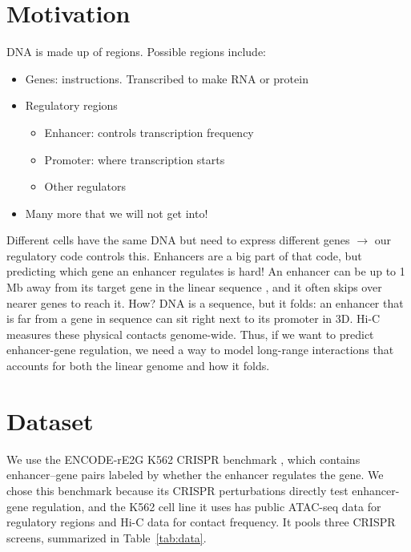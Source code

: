 \section{Motivation}
DNA is made up of regions. Possible regions include:
\begin{itemize}[nosep]
  \item Genes: instructions. Transcribed to make RNA or protein
  \item Regulatory regions
  \begin{itemize}[nosep]
    \item Enhancer: controls transcription frequency
    \item Promoter: where transcription starts
    \item Other regulators
  \end{itemize}
  \item Many more that we will not get into!
\end{itemize}


Different cells have the same DNA but need to express different genes $\rightarrow$ our regulatory code controls this. Enhancers are a big part of that code, but predicting which gene an enhancer regulates is hard! An enhancer can be up to 1 Mb away from its target gene in the linear sequence \cite{lettice2003}, and it often skips over nearer genes to reach it. How? DNA is a sequence, but it folds: an enhancer that is far from a gene in sequence can sit right next to its promoter in 3D. Hi-C \cite{liebermanaiden2009} measures these physical contacts genome-wide. Thus, if we want to predict enhancer-gene regulation, we need a way to model long-range interactions that accounts for both the linear genome and how it folds.

\section{Dataset}
We use the ENCODE-rE2G K562 CRISPR benchmark \cite{gschwind2023encode}, which contains enhancer--gene pairs labeled by whether the enhancer regulates the gene. We chose this benchmark because its CRISPR perturbations directly test enhancer-gene regulation, and the K562 cell line it uses has public ATAC-seq data for regulatory regions and Hi-C data for contact frequency. It pools three CRISPR screens, summarized in Table~\ref{tab:data}.

